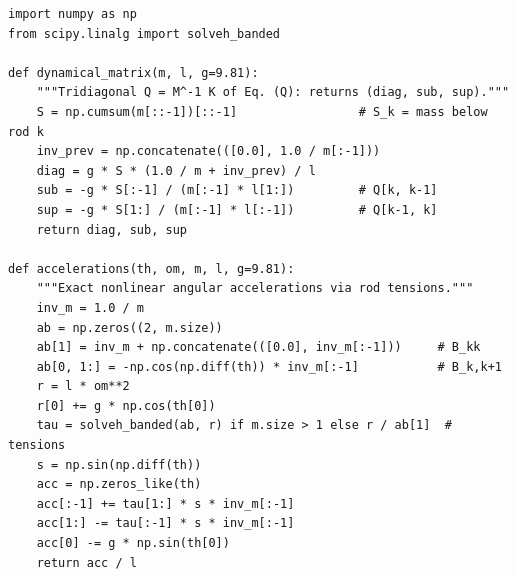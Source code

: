 \documentclass[11pt]{article}
\begin{document}
\begin{lstlisting}
import numpy as np
from scipy.linalg import solveh_banded

def dynamical_matrix(m, l, g=9.81):
    """Tridiagonal Q = M^-1 K of Eq. (Q): returns (diag, sub, sup)."""
    S = np.cumsum(m[::-1])[::-1]                 # S_k = mass below rod k
    inv_prev = np.concatenate(([0.0], 1.0 / m[:-1]))
    diag = g * S * (1.0 / m + inv_prev) / l
    sub = -g * S[:-1] / (m[:-1] * l[1:])         # Q[k, k-1]
    sup = -g * S[1:] / (m[:-1] * l[:-1])         # Q[k-1, k]
    return diag, sub, sup

def accelerations(th, om, m, l, g=9.81):
    """Exact nonlinear angular accelerations via rod tensions."""
    inv_m = 1.0 / m
    ab = np.zeros((2, m.size))
    ab[1] = inv_m + np.concatenate(([0.0], inv_m[:-1]))     # B_kk
    ab[0, 1:] = -np.cos(np.diff(th)) * inv_m[:-1]           # B_k,k+1
    r = l * om**2
    r[0] += g * np.cos(th[0])
    tau = solveh_banded(ab, r) if m.size > 1 else r / ab[1]  # tensions
    s = np.sin(np.diff(th))
    acc = np.zeros_like(th)
    acc[:-1] += tau[1:] * s * inv_m[:-1]
    acc[1:] -= tau[:-1] * s * inv_m[:-1]
    acc[0] -= g * np.sin(th[0])
    return acc / l
\end{lstlisting}



\end{document}
